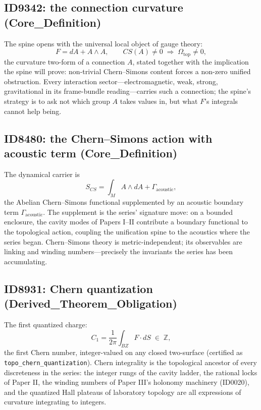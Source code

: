 \documentclass[11pt]{article}
\theoremstyle{remark}
\begin{document}
\subsection{ID9342: the connection curvature (Core\_Definition)}

The spine opens with the universal local object of gauge theory:
\begin{equation}
F = dA + A \wedge A, \qquad CS(A) \neq 0 \;\Longrightarrow\; \Omega_{\mathrm{top}} \neq 0,
\label{eq:curvature}
\end{equation}
the curvature two-form of a connection $A$, stated together with the implication the spine will prove: non-trivial Chern--Simons content forces a non-zero unified obstruction. Every interaction sector---electromagnetic, weak, strong, gravitational in its frame-bundle reading---carries such a connection; the spine's strategy is to ask not which group $A$ takes values in, but what $F$'s integrals cannot help being.

\subsection{ID8480: the Chern--Simons action with acoustic term (Core\_Definition)}

The dynamical carrier is
\begin{equation}
S_{CS} = \int_M A \wedge dA + \Gamma_{\mathrm{acoustic}},
\label{eq:cs}
\end{equation}
the Abelian Chern--Simons functional supplemented by an acoustic boundary term $\Gamma_{\mathrm{acoustic}}$. The supplement is the series' signature move: on a bounded enclosure, the cavity modes of Papers I--II contribute a boundary functional to the topological action, coupling the unification spine to the acoustics where the series began. Chern--Simons theory is metric-independent; its observables are linking and winding numbers---precisely the invariants the series has been accumulating.

\subsection{ID8931: Chern quantization (Derived\_Theorem\_Obligation)}

The first quantized charge:
\begin{equation}
C_1 = \frac{1}{2\pi} \int_{BZ} F \cdot dS \;\in\; \mathbb{Z},
\label{eq:chern}
\end{equation}
the first Chern number, integer-valued on any closed two-surface (certified as \texttt{topo\_chern\_quantization}). Chern integrality is the topological ancestor of every discreteness in the series: the integer rungs of the cavity ladder, the rational locks of Paper II, the winding numbers of Paper III's holonomy machinery (ID0020), and the quantized Hall plateaus of laboratory topology are all expressions of curvature integrating to integers.
\end{document}
